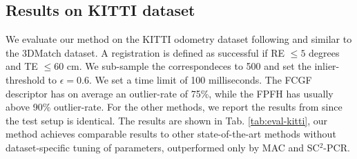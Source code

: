\subsection{Results on KITTI dataset}


We evaluate our method on the KITTI odometry dataset \cite{Kitti-Geiger2013IJRR} following \cite{SC2-PCR-Chen-2022-CVPR, zhang20233d} and similar to the 3DMatch dataset. A registration is defined as successful if RE $\leq 5$ degrees and TE $\leq 60$ cm.
We sub-sample the correspondeces to 500 and set the inlier-threshold to $\epsilon = 0.6$. We set a time limit of 100 milliseconds. The FCGF \cite{9009829} descriptor has on average an outlier-rate of 75\%, while the FPFH has usually above 90\% outlier-rate. For the other methods, we report the results from \cite{zhang20233d} since the test setup is identical. The results are shown in Tab. \ref{tab:eval-kitti}, our method achieves comparable results to other state-of-the-art methods without dataset-specific tuning of parameters, outperformed only by MAC and SC$^2$-PCR.


